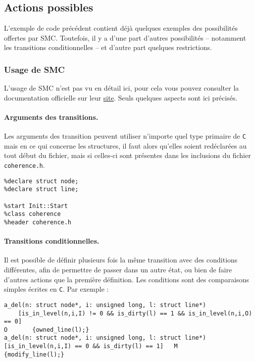\subsection{Actions possibles}

L'exemple de code précédent contient déjà quelques exemples des possibilités offertes par \textsf{SMC}. Toutefois, il y a d'une part d'autres possibilités -- notamment les transitions conditionnelles -- et d'autre part quelques restrictions.

\subsubsection{Usage de \textsf{SMC}}

L'usage de \textsf{SMC} n'est pas vu en détail ici, pour cela vous pouvez consulter la documentation officielle sur leur \href{http://smc.sourceforge.net/SmcManual.htm}{site}. Seuls quelques aspects sont ici précisés.

\paragraph{Arguments des transitions.}
Les arguments des transition peuvent utiliser n'importe quel type primaire de \texttt{C} mais en ce qui concerne les structures, il faut alors qu'elles soient redéclarées au tout début du fichier, mais si celles-ci sont présentes dans les inclusions du fichier \texttt{coherence.h}.

\begin{framed}
\begin{verbatim}
%declare struct node;
%declare struct line;

%start Init::Start
%class coherence
%header coherence.h
\end{verbatim}
\end{framed}

\paragraph{Transitions conditionnelles.}
Il est possible de définir plusieurs fois la même transition avec des conditions différentes, afin de permettre de passer dans un autre état, ou bien de faire d'autres actions que la première définition. Les conditions sont des comparaisons simples écrites en \texttt{C}. Par exemple :
\begin{framed}
\begin{verbatim}
a_del(n: struct node*, i: unsigned long, l: struct line*)  
    [is_in_level(n,i,I) != 0 && is_dirty(l) == 1 && is_in_level(n,i,O) == 0]                                                                                                         O       {owned_line(l);}
a_del(n: struct node*, i: unsigned long, l: struct line*)    [is_in_level(n,i,I) == 0 && is_dirty(l) == 1]   M      {modify_line(l);}
\end{verbatim}
\end{framed}

